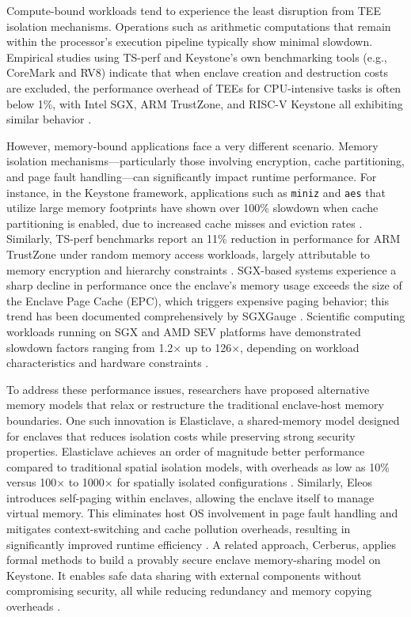 Compute-bound workloads tend to experience the least disruption from TEE isolation mechanisms. Operations such as arithmetic computations that remain within the processor’s execution pipeline typically show minimal slowdown. Empirical studies using TS-perf and Keystone’s own benchmarking tools (e.g., CoreMark and RV8) indicate that when enclave creation and destruction costs are excluded, the performance overhead of TEEs for CPU-intensive tasks is often below 1\%, with Intel SGX, ARM TrustZone, and RISC-V Keystone all exhibiting similar behavior \cite{Suzaki2021,dayeol2019keystone}.

However, memory-bound applications face a very different scenario. Memory isolation mechanisms—particularly those involving encryption, cache partitioning, and page fault handling—can significantly impact runtime performance. For instance, in the Keystone framework, applications such as \texttt{miniz} and \texttt{aes} that utilize large memory footprints have shown over 100\% slowdown when cache partitioning is enabled, due to increased cache misses and eviction rates \cite{dayeol2019keystone}. Similarly, TS-perf benchmarks report an 11\% reduction in performance for ARM TrustZone under random memory access workloads, largely attributable to memory encryption and hierarchy constraints \cite{Suzaki2021}. SGX-based systems experience a sharp decline in performance once the enclave's memory usage exceeds the size of the Enclave Page Cache (EPC), which triggers expensive paging behavior; this trend has been documented comprehensively by SGXGauge \cite{kumar2022sgxgauge}. Scientific computing workloads running on SGX and AMD SEV platforms have demonstrated slowdown factors ranging from 1.2× up to 126×, depending on workload characteristics and hardware constraints \cite{akkram2020scientific}.

To address these performance issues, researchers have proposed alternative memory models that relax or restructure the traditional enclave-host memory boundaries. One such innovation is Elasticlave, a shared-memory model designed for enclaves that reduces isolation costs while preserving strong security properties. Elasticlave achieves an order of magnitude better performance compared to traditional spatial isolation models, with overheads as low as 10\% versus 100× to 1000× for spatially isolated configurations \cite{yu2022elasticlave}. Similarly, Eleos introduces self-paging within enclaves, allowing the enclave itself to manage virtual memory. This eliminates host OS involvement in page fault handling and mitigates context-switching and cache pollution overheads, resulting in significantly improved runtime efficiency \cite{orenbach2023eleos}. A related approach, Cerberus, applies formal methods to build a provably secure enclave memory-sharing model on Keystone. It enables safe data sharing with external components without compromising security, all while reducing redundancy and memory copying overheads \cite{lee2022cerberus}.

